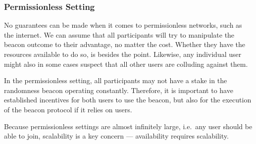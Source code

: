 \subsubsection{Permissionless Setting}
No guarantees can be made when it comes to permissionless networks, such as the internet.
We can assume that all participants will try to manipulate the beacon outcome to their advantage, no matter the cost.
Whether they have the resources available to do so, is besides the point.
Likewise, any individual user might also in some cases suspect that all other users are colluding against them.

In the permissionless setting, all participants may not have a stake in the randomness beacon operating constantly.
Therefore, it is important to have established incentives for both users to use the beacon, but also for the execution of the beacon protocol if it relies on users.

Because permissionless settings are almost infinitely large, i.e.\ any user should be able to join, scalability is a key concern --- availability requires scalability.
